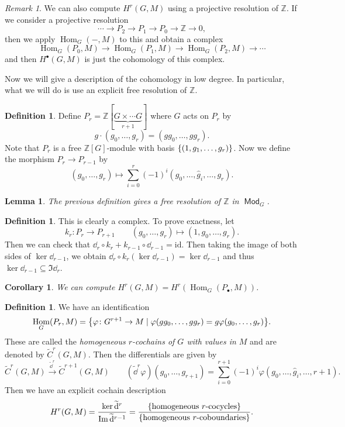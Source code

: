 \documentclass[leqno, openany]{memoir}
\newtheorem{cor}[thm]{Corollary}
\newtheorem{lem}[thm]{Lemma}
\theoremstyle{definition}
\newtheorem{defn}[thm]{Definition}
\theoremstyle{remark}
\newtheorem{rmk}[thm]{Remark}
\theoremstyle{plain}
\theoremstyle{definition}
\theoremstyle{remark}
\newcommand{\Z}{\mathbb{Z}}
\newcommand{\mr}[1]{\mathrm{#1}}
\newcommand{\wt}[1]{\widetilde{#1}}
\newcommand{\wh}[1]{\widehat{#1}}
\DeclareMathOperator{\Hom}{Hom}
\DeclareMathOperator{\Mod}{\mathsf{Mod}}
\begin{document}
\begin{rmk}
    We can also compute $H^r(G, M)$ using a projective resolution of $\Z$. If we consider a projective resolution
    \[ \cdots \to P_2 \to P_1 \to P_0 \to \Z \to 0, \]
    then we apply $\Hom_G(-,M)$ to this and obtain a complex
    \[ \Hom_G(P_0, M) \to \Hom_G(P_1, M) \to \Hom_G(P_2, M) \to \cdots \]
    and then $H^{\bullet}(G, M)$ is just the cohomology of this complex.
\end{rmk}

Now we will give a description of the cohomology in low degree. In particular, what we will do is use an explicit free resolution of $\Z$.

\begin{defn}
    Define $P_r = \Z[\underbrace{G \times \cdots G}_{r+1}]$ where $G$ acts on $P_r$ by
    \[ g \cdot (g_0, \ldots, g_r) = (gg_0, \ldots, gg_r). \]
    Note that $P_r$ is a free $\Z[G]$-module with basis $\qty{(1, g_1, \ldots, g_r)}$. Now we define the morphism $P_r \to P_{r-1}$ by
    \[ (g_0, \ldots, g_r) \mapsto \sum_{i=0}^r {(-1)}^i (g_0, \ldots, \wh{g}_i, \ldots, g_r). \]
\end{defn}

\begin{lem}
    The previous definition gives a free resolution of $\Z$ in $\Mod_G$.
\end{lem}

\begin{defn}
    This is clearly a complex. To prove exactness, let 
    \[ k_r \colon P_r \to P_{r+1} \qquad (g_0, \ldots, g_r) \mapsto (1, g_0, \ldots, g_r). \]
    Then we can check that $\dd_r \circ k_r + k_{r-1} \circ \dd_{r-1} = \mr{id}$. Then taking the image of both sides of $\ker \dd_{r-1}$, we obtain $\dd_r \circ k_r (\ker \dd_{r-1}) = \ker \dd_{r-1}$ and thus $\ker \dd_{r-1} \subseteq \Im \dd_r$.
\end{defn}

\begin{cor}
    We can compute $H^r(G, M) = H^r(\Hom_G(P_{\bullet}, M))$.
\end{cor}

\begin{defn}
    We have an identification 
    \[ \Hom_G(P_r, M) = \qty{\varphi \colon G^{r+1} \to M \mid \varphi(g g_0, \ldots, g g_r) = g \varphi(g_0, \ldots, g_r)}. \]
    These are called the \textit{homogeneous $r$-cochains of $G$ with values in $M$} and are denoted by $\wt{C}^r(G, M)$. Then the differentials are given by
    \[ \wt{C}^r(G,M) \xrightarrow{\wt{\dd}^r} \wt{C}^{r+1}(G,M) \qquad (\wt{\dd}^r \varphi) (g_0, \ldots, g_{r+1}) = \sum_{i=0}^{r+1} {(-1)}^i \varphi (g_0, \ldots, \wh{g}_i, \ldots, r+1). \]
    Then we have an explicit cochain description
    \[ H^r(G, M) = \frac{\ker \wt{\dd}^r}{\Im \wt{\dd}^{r-1}} = \frac{\qty{\text{homogeneous $r$-cocycles}}}{\qty{\text{homogeneous $r$-coboundaries}}}. \]
\end{defn}
\end{document}
